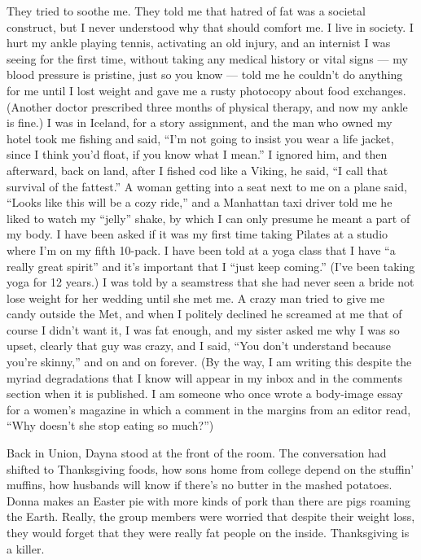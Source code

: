 They tried to soothe me. They told me that hatred of fat was a societal
construct, but I never understood why that should comfort me. I live in
society. I hurt my ankle playing tennis, activating an old injury, and
an internist I was seeing for the first time, without taking any medical
history or vital signs --- my blood pressure is pristine, just so you
know --- told me he couldn't do anything for me until I lost weight and
gave me a rusty photocopy about food exchanges. (Another doctor
prescribed three months of physical therapy, and now my ankle is fine.)
I was in Iceland, for a story assignment, and the man who owned my hotel
took me fishing and said, ``I'm not going to insist you wear a life
jacket, since I think you'd float, if you know what I mean.'' I ignored
him, and then afterward, back on land, after I fished cod like a Viking,
he said, ``I call that survival of the fattest.'' A woman getting into a
seat next to me on a plane said, ``Looks like this will be a cozy
ride,'' and a Manhattan taxi driver told me he liked to watch my
``jelly'' shake, by which I can only presume he meant a part of my body.
I have been asked if it was my first time taking Pilates at a studio
where I'm on my fifth 10-pack. I have been told at a yoga class that I
have ``a really great spirit'' and it's important that I ``just keep
coming.'' (I've been taking yoga for 12 years.) I was told by a
seamstress that she had never seen a bride not lose weight for her
wedding until she met me. A crazy man tried to give me candy outside the
Met, and when I politely declined he screamed at me that of course I
didn't want it, I was fat enough, and my sister asked me why I was so
upset, clearly that guy was crazy, and I said, ``You don't understand
because you're skinny,'' and on and on forever. (By the way, I am
writing this despite the myriad degradations that I know will appear in
my inbox and in the comments section when it is published. I am someone
who once wrote a body-image essay for a women's magazine in which a
comment in the margins from an editor read, ``Why doesn't she stop
eating so much?'')

Back in Union, Dayna stood at the front of the room. The conversation
had shifted to Thanksgiving foods, how sons home from college depend on
the stuffin' muffins, how husbands will know if there's no butter in the
mashed potatoes. Donna makes an Easter pie with more kinds of pork than
there are pigs roaming the Earth. Really, the group members were worried
that despite their weight loss, they would forget that they were really
fat people on the inside. Thanksgiving is a killer.

